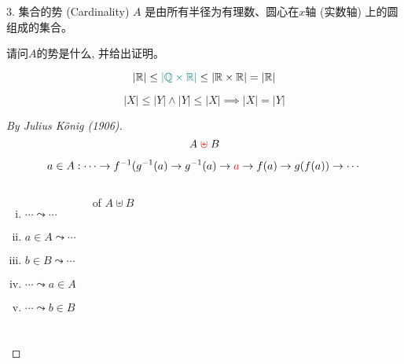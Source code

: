 \begin{frame}{}
  \begin{exampleblock}{$3.$ 集合的势 (Cardinality)}
    $A$ 是由所有半径为有理数、圆心在$x$轴 (实数轴) 上的圆组成的集合。

    请问$A$的势是什么, 并给出证明。
  \end{exampleblock}

  \pause
  \vspace{0.30cm}
  \[
    |\mathbb{R}| \le \textcolor{teal}{|\mathbb{Q} \times \mathbb{R}|} \le |\mathbb{R} \times \mathbb{R}| = |\mathbb{R}|
  \]
\end{frame}

\begin{frame}{}


  \vspace{0.30cm}
  \begin{theorem}
    \[
      |X| \le |Y| \land |Y| \le |X| \implies |X| = |Y|
    \]
  \end{theorem}
\end{frame}

\begin{frame}{}
  \begin{proof}[By Julius K\"{o}nig (1906)]
    \[
      A \textcolor{red}{\;\uplus\;} B
    \]

    \pause
    \[
      a \in A: \cdots \to f^{-1}(g^{-1}(a) \to g^{-1}(a) \to \textcolor{red}{a} \to f(a) \to g(f(a)) \to \cdots
    \]

    \begin{columns}
	\pause
	\begin{enumerate}[(i)]
	  \item $\cdots \leadsto \cdots$
	  \item $a \in A \leadsto \cdots$
	  \item $b \in B \leadsto \cdots$
	  \item $\cdots \leadsto a \in A$
	  \item $\cdots \leadsto b \in B$
	\end{enumerate}
        \pause
	\centerline{ of $A \uplus B$}
    \end{columns}
  \end{proof}
\end{frame}
